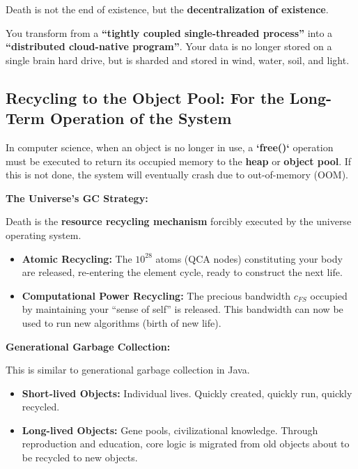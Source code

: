 Death is not the end of existence, but the \textbf{decentralization of existence}.

You transform from a \textbf{``tightly coupled single-threaded process''} into a \textbf{``distributed cloud-native program''}. Your data is no longer stored on a single brain hard drive, but is sharded and stored in wind, water, soil, and light.

\subsection{Recycling to the Object Pool: For the Long-Term Operation of the System}

In computer science, when an object is no longer in use, a \textbf{`free()`} operation must be executed to return its occupied memory to the \textbf{heap} or \textbf{object pool}. If this is not done, the system will eventually crash due to out-of-memory (OOM).

\textbf{The Universe's GC Strategy:}

Death is the \textbf{resource recycling mechanism} forcibly executed by the universe operating system.

\begin{itemize}
\item \textbf{Atomic Recycling:} The \textbf{$10^{28}$} atoms (QCA nodes) constituting your body are released, re-entering the element cycle, ready to construct the next life.

\item \textbf{Computational Power Recycling:} The precious bandwidth \textbf{$c_{FS}$} occupied by maintaining your ``sense of self'' is released. This bandwidth can now be used to run new algorithms (birth of new life).
\end{itemize}

\textbf{Generational Garbage Collection:}

This is similar to generational garbage collection in Java.

\begin{itemize}
\item \textbf{Short-lived Objects:} Individual lives. Quickly created, quickly run, quickly recycled.

\item \textbf{Long-lived Objects:} Gene pools, civilizational knowledge. Through reproduction and education, core logic is migrated from old objects about to be recycled to new objects.
\end{itemize}

